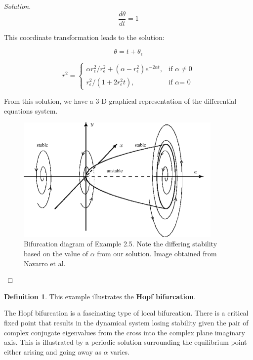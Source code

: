 \documentclass{article}
\theoremstyle{definition}
\newtheorem{definition}{Definition}[section]
\theoremstyle{remark}
\begin{document}
\begin{proof}[Solution]
\begin{equation}
    \frac{d\theta}{dt} = 1
\end{equation}

This coordinate transformation leads to the solution:

\begin{equation}
    \theta = t + \theta_\epsilon
\end{equation}

\begin{equation}
    r^2 = \begin{cases} \alpha r^2_\epsilon / r^2_\epsilon + (\alpha-r^2_\epsilon)e^{-2\alpha t}, & \mbox{if } \alpha{  \neq 0} \\ r^2_\epsilon / (1 + 2r^2_\epsilon t), & \mbox{if } \alpha \mbox{= 0} \end{cases}
\end{equation} 

From this solution, we have a 3-D graphical representation of the differential equations system.

\begin{figure}[H]
    \centering
    \includegraphics[width=100mm,scale=1.0]{images/Hopf.png}
    \caption{Bifurcation diagram of Example 2.5. Note the differing stability based on the value of $\alpha$ from our solution. Image obtained from Navarro et al. \cite{Navarro2008}}
    \label{fig:hopf}
\end{figure}
\end{proof}

\begin{definition}
    This example illustrates the \textbf{Hopf bifurcation}.
\end{definition}
The Hopf bifurcation is a fascinating type of local bifurcation. There is a critical fixed point that results in the dynamical system losing stability given the pair of complex conjugate eigenvalues from the cross into the complex plane imaginary axis. This is illustrated by a periodic solution surrounding the equilibrium point either arising and going away as $\alpha$ varies.
\end{document}
